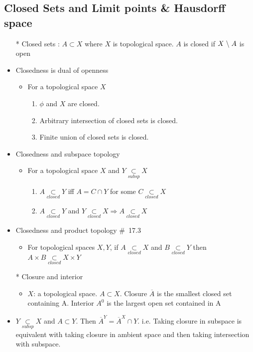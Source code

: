 \documentclass[12pt]{article}
\newcommand{\sptwo}{\hspace{0.2cm}}
\newcommand{\spone}{\hspace{0.1cm}}
\newcommand{\closed}{\underset{closed}{\subset}}
\newcommand{\subsp}{\underset{subsp}{\subset}}
\newcommand{\diff}{\spone\backslash\spone}
\begin{document}
\bigskip
\subsection{Closed Sets and Limit points \& Hausdorff space}
\smallskip
\begin{itemize}
	\item[*] Closed sets : $A\subset X$ where $X$ is topological space. $A$ is closed if $X\diff A$ is open
	\item Closedness is dual of openness
	\begin{itemize}
		\item For a topological space $X$
		\begin{enumerate}
			\item $\phi$ and $X$ are closed.
			\item Arbitrary intersection of closed sets is closed.
			\item Finite union of closed sets is closed.
		\end{enumerate}
	\end{itemize}
	\item Closedness and subspace topology
	\begin{itemize}
		\item For a topological space $X$ and $Y\subsp X$
		\begin{enumerate}
			\item $A\closed Y$ iff $A=C\cap Y$ for some $C\closed X$
			\item $A\closed Y$ and $Y\closed X \Rightarrow A\closed X$
		\end{enumerate}
	\end{itemize}
	\item Closedness and product topology \quad \#\ 17.3
	\begin{itemize}
		\item For topological spaces $X, Y$, if $A\closed X$ and $B\closed Y$ then $A\times B \closed X\times Y$
	\end{itemize}
	\item[*] Closure and interior
	\begin{itemize}
		\item $X$: a topological space. $A\subset X$. Closure $\overline{A}$ is the smallest closed set containing A. Interior $A^0$ is the largest open set contained in A
	\end{itemize}
	\item $Y\subsp X$ and $A\subset Y$. Then $\overline{A}^{Y}=\overline{A}^{X}\cap Y$. \sptwo i.e. \sptwo Taking closure in subspace is equivalent with taking closure in ambient space and then taking intersection with subspace.

\end{itemize}
\end{document}
